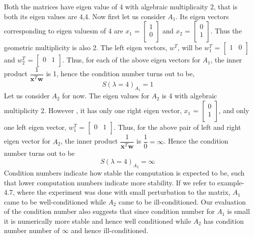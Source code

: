 \documentclass{article}
\begin{document}
Both the matrices have eigen value of 4 with algebraic multiplicaity 2, that is both its eigen values are 4,4. \newline
Now first let us consider $A_{1}$. Its eigen vectors corresponding to eigen valuesm of 4 are \textbf {$x_{1}$} = $\begin{bmatrix} 1 \\ 0 \\ \end{bmatrix}$ and $x_{2}$ = $\begin{bmatrix} 0 \\ 1 \\ \end{bmatrix}$. Thus the geometric multiplicity is also 2. The left eigen vectors, \textbf {$w^T$}, will be $w_{1}^T$ = $\begin{bmatrix} 1 & 0 \\ \end{bmatrix}$ and $w_{2}^T$ = $\begin{bmatrix} 0 & 1 \\ \end{bmatrix}$. \newline
Thus, for each of the above eigen vectors for $A_{1}$, the inner product $\dfrac{1}{\textbf {x}^T\textbf{w}}$ is 1, hence the condition number turns out to be, \newline
\begin{equation}
  S(\lambda = 4)_{A_{1}} = 1
\end{equation}
Let us consider $A_{2}$ for now. The eigen values for $A_{2}$ is 4 with algebraic multiplicity 2. However , it has only one right eigen vector, $x_{1}$ = $\begin{bmatrix} 0 \\ 1 \\ \end{bmatrix}$, and only one left eigen vector, $w_{1}^T$ = $\begin{bmatrix} 0 & 1 \\ \end{bmatrix}$. \newline
Thus, for the above pair of left and right eigen vector for $A_{2}$, the inner product $\dfrac{1}{\textbf {x}^T\textbf{w}}$ is $\dfrac{1}{0} = \infty$. Hence the condition number turns out to be \newline
\begin{equation}
  S(\lambda = 4)_{A_{2}} = \infty
\end{equation}
Condition numbers indicate how stable the computation is expected to be, such that lower computation numbers indicate more stability. If we refer to example-4.7, where the experiment was done with small perturbation to the matrix, $A_{1}$ came to be well-conditioned while $A_{2}$ came to be ill-conditioned. Our evaluation of the condition number also suggests that since condition number for $A_{1}$ is small it is numerically more stable and hence well conditioned while $A_{2}$ has condition number number of $\infty$ and hence ill-conditioned. \newline
\end{document}
